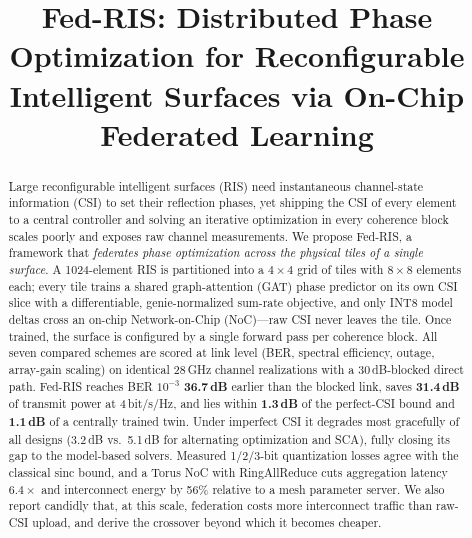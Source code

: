 \documentclass[conference]{IEEEtran}
\newcommand{\fedris}{Fed-RIS}
\newcommand{\dB}{\,dB\xspace}
\begin{document}
\title{Fed-RIS: Distributed Phase Optimization for Reconfigurable Intelligent Surfaces via On-Chip Federated Learning}

\author{
}

\maketitle

\begin{abstract}
Large reconfigurable intelligent surfaces (RIS) need instantaneous channel-state information (CSI) to set their reflection phases, yet shipping the CSI of every element to a central controller and solving an iterative optimization in every coherence block scales poorly and exposes raw channel measurements. We propose \fedris{}, a framework that \emph{federates phase optimization across the physical tiles of a single surface}. A 1024-element RIS is partitioned into a $4\times4$ grid of tiles with $8\times8$ elements each; every tile trains a shared graph-attention (GAT) phase predictor on its own CSI slice with a differentiable, genie-normalized sum-rate objective, and only INT8 model deltas cross an on-chip Network-on-Chip (NoC)---raw CSI never leaves the tile. Once trained, the surface is configured by a single forward pass per coherence block. All seven compared schemes are scored at link level (BER, spectral efficiency, outage, array-gain scaling) on identical 28\,GHz channel realizations with a 30\dB-blocked direct path. \fedris{} reaches BER $10^{-3}$ \textbf{36.7\dB} earlier than the blocked link, saves \textbf{31.4\dB} of transmit power at 4\,bit/s/Hz, and lies within \textbf{1.3\dB} of the perfect-CSI bound and \textbf{1.1\dB} of a centrally trained twin. Under imperfect CSI it degrades most gracefully of all designs (3.2\dB vs.\ 5.1\dB for alternating optimization and SCA), fully closing its gap to the model-based solvers. Measured 1/2/3-bit quantization losses agree with the classical sinc bound, and a Torus NoC with RingAllReduce cuts aggregation latency $6.4\times$ and interconnect energy by 56\% relative to a mesh parameter server. We also report candidly that, at this scale, federation costs more interconnect traffic than raw-CSI upload, and derive the crossover beyond which it becomes cheaper.
\end{abstract}
\end{document}
